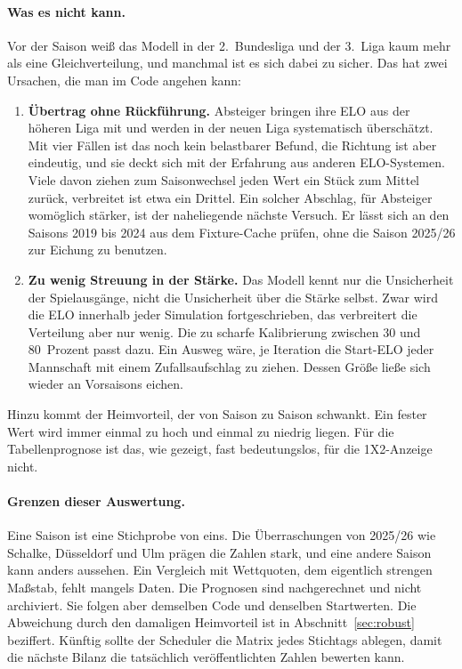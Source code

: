 \documentclass[11pt,a4paper,parskip=half,numbers=noenddot]{scrartcl}
\begin{document}
\paragraph{Was es nicht kann.} Vor der Saison weiß das Modell in der
2.~Bundesliga und der 3.~Liga kaum mehr als eine Gleichverteilung, und
manchmal ist es sich dabei zu sicher. Das hat zwei Ursachen, die man im Code
angehen kann:
\begin{enumerate}
  \item \textbf{Übertrag ohne Rückführung.} Absteiger bringen ihre ELO aus
        der höheren Liga mit und werden in der neuen Liga systematisch
        überschätzt. Mit vier Fällen ist das noch kein belastbarer Befund,
        die Richtung ist aber eindeutig, und sie deckt sich mit der
        Erfahrung aus anderen ELO-Systemen. Viele davon ziehen zum Saisonwechsel
        jeden Wert ein Stück zum Mittel zurück, verbreitet ist etwa ein
        Drittel.
        Ein solcher Abschlag, für Absteiger womöglich stärker, ist der
        naheliegende nächste Versuch. Er lässt sich an den Saisons 2019 bis
        2024 aus dem Fixture-Cache prüfen, ohne die Saison 2025/26 zur
        Eichung zu benutzen.
  \item \textbf{Zu wenig Streuung in der Stärke.} Das Modell kennt nur die
        Unsicherheit der Spielausgänge, nicht die Unsicherheit über die
        Stärke selbst. Zwar wird die ELO innerhalb jeder Simulation
        fortgeschrieben, das verbreitert die Verteilung aber nur wenig.
        Die zu scharfe Kalibrierung zwischen 30 und 80~Prozent passt dazu.
        Ein Ausweg wäre, je Iteration die Start-ELO jeder Mannschaft mit
        einem Zufallsaufschlag zu ziehen. Dessen Größe ließe sich wieder an
        Vorsaisons eichen.
\end{enumerate}
Hinzu kommt der Heimvorteil, der von Saison zu Saison schwankt. Ein fester
Wert wird immer einmal zu hoch und einmal zu niedrig liegen. Für die
Tabellenprognose ist das, wie gezeigt, fast bedeutungslos, für die 1X2-Anzeige
nicht.

\paragraph{Grenzen dieser Auswertung.} Eine Saison ist eine Stichprobe von
eins. Die Überraschungen von 2025/26 wie Schalke, Düsseldorf und Ulm prägen
die Zahlen stark, und eine andere Saison kann anders aussehen. Ein
Vergleich mit Wettquoten, dem eigentlich strengen Maßstab, fehlt mangels
Daten. Die Prognosen sind nachgerechnet und nicht archiviert. Sie folgen
aber demselben Code und denselben Startwerten. Die Abweichung durch den
damaligen Heimvorteil ist in Abschnitt~\ref{sec:robust} beziffert. Künftig
sollte der Scheduler die Matrix jedes Stichtags ablegen, damit die nächste
Bilanz die tatsächlich veröffentlichten Zahlen bewerten kann.
\end{document}
